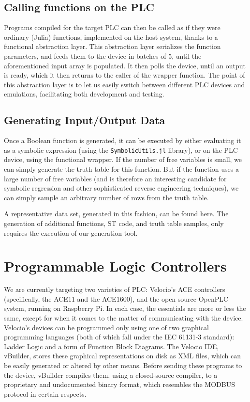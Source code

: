 \documentclass[11pt]{article}
\begin{document}
\subsection{Calling functions on the PLC}
\label{sec:orgbdb1add}

Programs compiled for the target PLC can then be called as if they were ordinary (Julia) functions, implemented on the host system, thanks to a functional abstraction layer. This abstraction layer serializes the function parameters, and feeds them to the device in batches of 5, until the aforementioned input array is populated. It then polls the device, until an output is ready, which it then returns to the caller of the wrapper function. The point of this abstraction layer is to let us easily switch between different PLC devices and emulations, facilitating both development and testing.

\subsection{Generating Input/Output Data}
\label{sec:org7ddace5}

Once a Boolean function is generated, it can be executed by either evaluating it as a symbolic expression (using the \texttt{SymbolicUtils.jl} library), or on the PLC device, using the functional wrapper. If the number of free variables is small, we can simply generate the truth table for this function. But if the function uses a large number of free variables (and is therefore an interesting candidate for symbolic regression and other sophisticated reverse engineering techniques), we can simply sample an arbitrary number of rows from the truth table.

A representative data set, generated in this fashion, can be \href{https://github.com/oblivia-simplex/refusr/blob/main/Refusr/milestone2\_samples.tgz}{found here}. The generation of additional functions, ST code, and truth table samples, only requires the execution of our generation tool.

\section{Programmable Logic Controllers}
\label{sec:org9683bca}

We are currently targeting two varieties of PLC: Velocio's ACE controllers (specifically, the ACE11 and the ACE1600), and the open source OpenPLC system, running on Raspberry Pi. In each case, the essentials are more or less the same, except for when it comes to the matter of communicating with the device. Velocio's devices can be programmed only using one of two graphical programming languages (both of which fall under the IEC 61131-3 standard): Ladder Logic and a form of Function Block Diagrams. The Velocio IDE, vBuilder, stores these graphical representations on disk as XML files, which can be easily generated or altered by other means. Before sending these programs to the device, vBuilder compiles them, using a closed-source compiler, to a proprietary and undocumented binary format, which resembles the MODBUS protocol in certain respects. 
\end{document}
